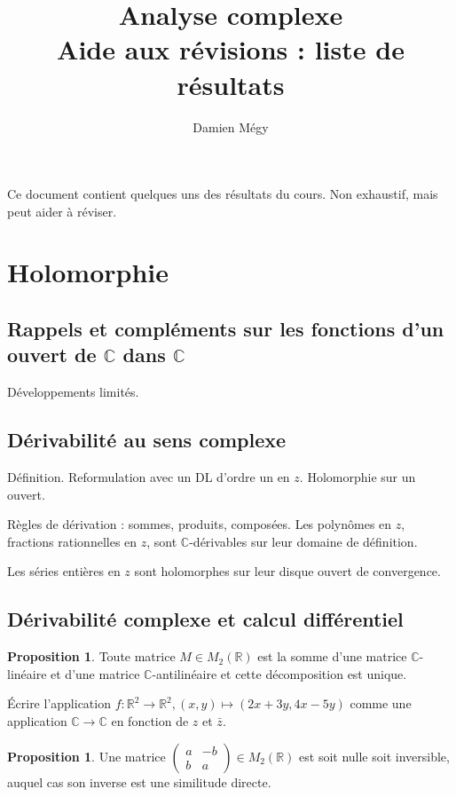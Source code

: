 \documentclass[11pt,a4paper]{article}
\title{Analyse complexe\\ Aide aux révisions : liste de résultats}
\author{Damien Mégy}
\newcommand{\R}{\mathbb{R}}
\newcommand{\C}{\mathbb{C}}
\theoremstyle{definition}
\newtheorem{proposition}[theoreme]{Proposition}
\theoremstyle{plain}
\begin{document}
\maketitle

Ce document contient quelques uns des résultats du cours. Non exhaustif, mais peut aider à réviser.

\section{Holomorphie}

\subsection{Rappels et compléments sur les fonctions d'un ouvert de $\C$ dans $\C$}

Développements limités.

\subsection{Dérivabilité au sens complexe}

Définition. Reformulation avec un DL d'ordre un en $z$. Holomorphie sur un ouvert.

Règles de dérivation : sommes, produits, composées.
Les polynômes en $z$, fractions rationnelles en $z$, sont $\C$-dérivables sur leur domaine de définition.

Les séries entières en $z$ sont holomorphes sur leur disque ouvert de convergence.

\subsection{Dérivabilité complexe et calcul différentiel}

\begin{proposition}
Toute matrice $M\in M_2(\R)$ est la somme d'une matrice $\C$-linéaire et d'une matrice $\C$-antilinéaire et cette décomposition est unique.
\end{proposition}

\begin{exo}
Écrire l'application $f:\R^2\to\R^2, (x,y)\mapsto (2x+3y,4x-5y)$ comme une application $\C\to\C$ en fonction de $z$ et $\bar z$.
\end{exo}

\begin{proposition}
Une matrice $\begin{pmatrix}
a & -b\\b & a
\end{pmatrix} \in M_2(\R)$ est soit nulle soit inversible, auquel cas son inverse est une similitude directe.
\end{proposition}
\end{document}
